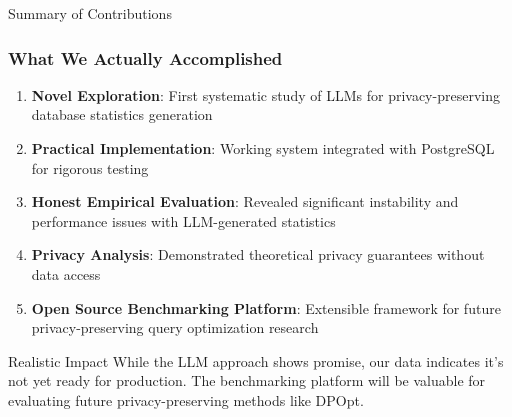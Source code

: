 \documentclass{beamer}
\begin{document}
\begin{frame}{Summary of Contributions}
\frametitle{What We Actually Accomplished}

\begin{enumerate}
    \item \textbf{Novel Exploration}: First systematic study of LLMs for privacy-preserving database statistics generation
    
    \item \textbf{Practical Implementation}: Working system integrated with PostgreSQL for rigorous testing
    
    \item \textbf{Honest Empirical Evaluation}: Revealed significant instability and performance issues with LLM-generated statistics
    
    \item \textbf{Privacy Analysis}: Demonstrated theoretical privacy guarantees without data access
    
    \item \textbf{Open Source Benchmarking Platform}: Extensible framework for future privacy-preserving query optimization research
\end{enumerate}

\vspace{0.5cm}

\begin{alertblock}{Realistic Impact}
While the LLM approach shows promise, our data indicates it's not yet ready for production. The benchmarking platform will be valuable for evaluating future privacy-preserving methods like DPOpt.
\end{alertblock}

\end{frame}
\end{document}

